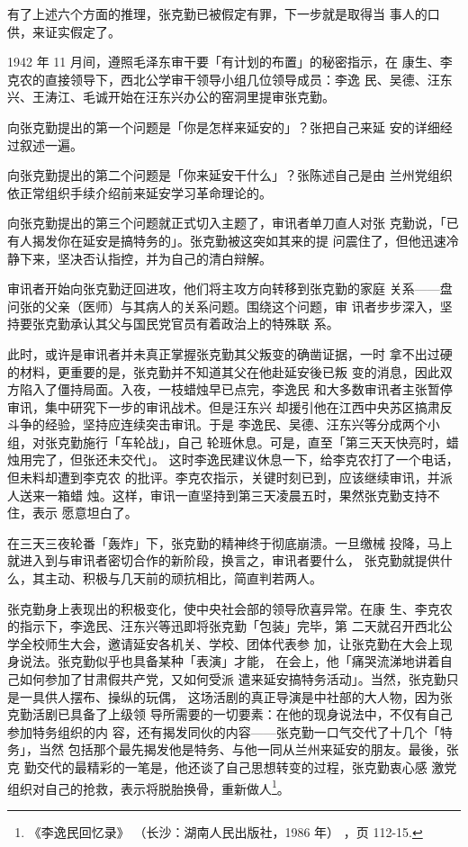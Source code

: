 有了上述六个方面的推理，张克勤已被假定有罪，下一步就是取得当
事人的口供，来证实假定了。

1942 年 11 月间，遵照毛泽东审干要「有计划的布置」的秘密指示，在
康生、李克农的直接领导下，西北公学审干领导小组几位领导成员：李逸
民、吴德、汪东兴、王涛江、毛诚开始在汪东兴办公的窑洞里提审张克勤。

向张克勤提出的第一个问题是「你是怎样来延安的」？张把自己来延
安的详细经过叙述一遍。

向张克勤提出的第二个问题是「你来延安干什么」？张陈述自己是由
兰州党组织依正常组织手续介绍前来延安学习革命理论的。

向张克勤提出的第三个问题就正式切入主题了，审讯者单刀直人对张
克勤说，「已有人揭发你在延安是搞特务的」。张克勤被这突如其来的提
问震住了，但他迅速冷静下来，坚决否认指控，并为自己的清白辩解。

审讯者开始向张克勤迂回进攻，他们将主攻方向转移到张克勤的家庭
关系——盘问张的父亲（医师）与其病人的关系问题。围绕这个问题，审
讯者步步深入，坚持要张克勤承认其父与国民党官员有着政治上的特殊联
系。

此时，或许是审讯者并未真正掌握张克勤其父叛变的确凿证据，一时
拿不出过硬的材料，更重要的是，张克勤并不知道其父在他赴延安後已叛
变的消息，因此双方陷入了僵持局面。入夜，一枝蜡烛早已点完，李逸民
和大多数审讯者主张暂停审讯，集中研究下一步的审讯战术。但是汪东兴
却援引他在江西中央苏区搞肃反斗争的经验，坚持应连续突击审讯。于是
李逸民、吴德、汪东兴等分成两个小组，对张克勤施行「车轮战」，自己
轮班休息。可是，直至「第三天天快亮时，蜡烛用完了，但张还未交代」。
这时李逸民建议休息一下，给李克农打了一个电话，但未料却遭到李克农
的批评。李克农指示，关键时刻已到，应该继续审讯，并派人送来一箱蜡
烛。这样，审讯一直坚持到第三天凌晨五时，果然张克勤支持不住，表示
愿意坦白了。

在三天三夜轮番「轰炸」下，张克勤的精神终于彻底崩溃。一旦缴械
投降，马上就进入到与审讯者密切合作的新阶段，换言之，审讯者要什么，
张克勤就提供什么，其主动、积极与几天前的顽抗相比，简直判若两人。

张克勤身上表现出的积极变化，使中央社会部的领导欣喜异常。在康
生、李克农的指示下，李逸民、汪东兴等迅即将张克勤「包装」完毕，第
二天就召开西北公学全校师生大会，邀请延安各机关、学校、团体代表参
加，让张克勤在大会上现身说法。张克勤似乎也具备某种「表演」才能，
在会上，他「痛哭流涕地讲着自己如何参加了甘肃假共产党，又如何受派
遣来延安搞特务活动」。当然，张克勤只是一具供人摆布、操纵的玩偶，
这场活剧的真正导演是中社部的大人物，因为张克勤活剧已具备了上级领
导所需要的一切要素：在他的现身说法中，不仅有自己参加特务组织的内
容，还有揭发同伙的内容——张克勤一口气交代了十几个「特务」，当然
包括那个最先揭发他是特务、与他一同从兰州来延安的朋友。最後，张克
勤交代的最精彩的一笔是，他还谈了自己思想转变的过程，张克勤衷心感
激党组织对自己的抢救，表示将脱胎换骨，重新做人\footnote{《李逸民回忆录》
（长沙：湖南人民出版社，1986 年）
，页 112-15.}。

